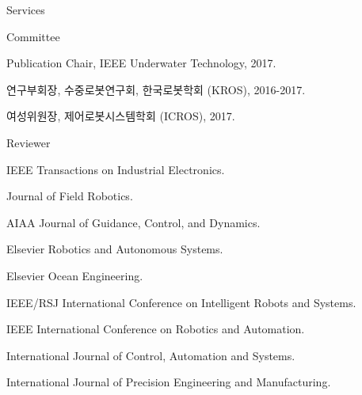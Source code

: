 \begin{rSection}{Services}


\begin{rSubsection}{Committee}{}{}{}
  \item Publication Chair, IEEE Underwater Technology, 2017.
  \item 연구부회장, 수중로봇연구회, 한국로봇학회 (KROS), 2016-2017.
  \item 여성위원장, 제어로봇시스템학회 (ICROS), 2017.
\end{rSubsection}

\begin{rSubsection}{Reviewer}{}{}{}
  \item IEEE Transactions on Industrial Electronics.
  \item Journal of Field Robotics.
  \item AIAA Journal of Guidance, Control, and Dynamics.
  \item Elsevier Robotics and Autonomous Systems.
  \item Elsevier Ocean Engineering.
  \item IEEE/RSJ International Conference on Intelligent Robots and Systems.
  \item IEEE International Conference on Robotics and Automation.
  \item International Journal of Control, Automation and Systems.
  \item International Journal of Precision Engineering and Manufacturing.
\end{rSubsection}

\end{rSection}

